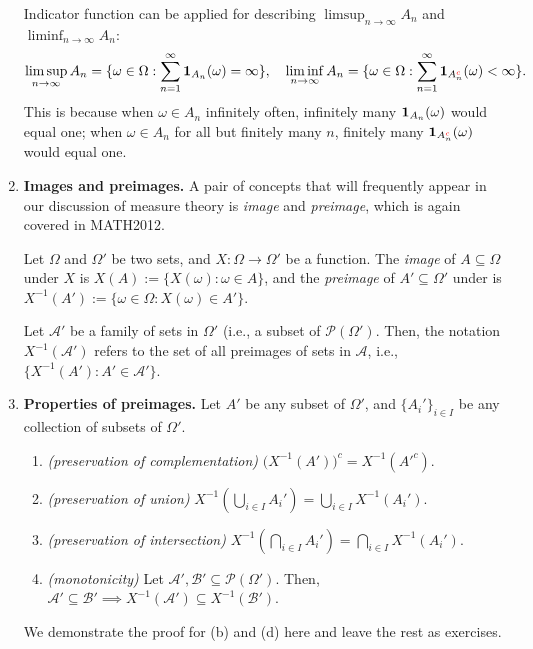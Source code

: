 \begin{enumerate}
Indicator function can be applied for describing \(\limsup_{n\to \infty}A_n\)
and \(\liminf_{n\to \infty}A_n\):
\[
\limsup_{n\to \infty}A_n
=\{\omega\in\Omega:\sum_{n=1}^{\infty}\mathbf{1}_{A_n}(\omega)=\infty\},\quad
\liminf_{n\to \infty}A_n
=\{\omega\in\Omega:\sum_{n=1}^{\infty}\mathbf{1}_{A_{n}^{{\color{red}c}}}(\omega)<\infty\}.
\]
This is because when \(\omega\in A_n\) infinitely often, infinitely many
\(\mathbf{1}_{A_n}(\omega)\) would equal one; when \(\omega\in A_n\) for all but
finitely many \(n\), finitely many \(\mathbf{1}_{A_n^{{\color{red}c}}}(\omega)\) would
equal one.

\item \textbf{Images and preimages.} A pair of concepts that will frequently
appear in our discussion of measure theory is \emph{image} and \emph{preimage},
which is again covered in MATH2012.

Let \(\Omega\) and \(\Omega'\) be two sets, and \(X:\Omega\to\Omega'\) be a
function.  The \emph{image} of \(A\subseteq \Omega\) under \(X\) is
\(X(A):=\{X(\omega):\omega\in A\}\), and the \emph{preimage} of \(A'\subseteq
\Omega'\) under  is \(X^{-1}(A'):=\{\omega\in\Omega:X(\omega)\in A'\}\).
\begin{center}
\end{center}
Let \(\mathcal{A}'\) be a family of sets in \(\Omega'\) (i.e., a subset of
\(\mathcal{P}(\Omega')\). Then, the notation \(X^{-1}(\mathcal{A}')\) refers to
the set of all preimages of sets in \(\mathcal{A}\), i.e.,
\(\{X^{-1}(A'):A'\in\mathcal{A}'\}\).
\item\label{it:preimg-prop} \textbf{Properties of preimages.} Let \(A'\) be any
subset of \(\Omega'\), and \(\{A_i'\}_{i\in I}\) be any collection of subsets of
\(\Omega'\).
\begin{enumerate}
\item \emph{(preservation of complementation)} \(\big(X^{-1}(A')\big)^{c}=X^{-1}(A'^{c})\).
\item \emph{(preservation of union)} \(X^{-1}(\bigcup_{i\in I}A_i')=\bigcup_{i\in I}X^{-1}(A_i')\).
\item \emph{(preservation of intersection)} \(X^{-1}(\bigcap_{i\in I}A_i')=\bigcap_{i\in I}X^{-1}(A_i')\).
\item \emph{(monotonicity)} Let \(\mathcal{A}',\mathcal{B}'\subseteq
\mathcal{P}(\Omega')\). Then, \(\mathcal{A}'\subseteq \mathcal{B}'\implies
X^{-1}(\mathcal{A}')\subseteq X^{-1}(\mathcal{B}')\).
\end{enumerate}
\begin{pf}
We demonstrate the proof for (b) and (d) here and leave the rest as exercises.


\end{pf}
\end{enumerate}
